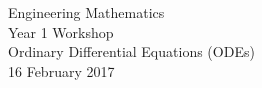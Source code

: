Engineering Mathematics\\
Year 1 Workshop\\
Ordinary Differential Equations (ODEs)\\
16 February 2017\\